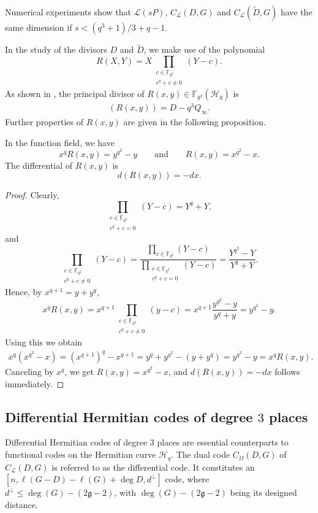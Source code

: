 \documentclass[entropy,article,submit,pdftex,moreauthors]{Definitions/mdpi}
\newcommand{\g}{\mathfrak{g}}
\begin{document}
\begin{Remark}
Numerical experiments show that $\mathscr{L}(sP)$, $C_{\mathcal{L}}(D,G)$ and $C_{\mathcal{L}}(\widetilde{D},G)$ have the same dimension if $s<(q^3+1)/3+q-1$. 
\end{Remark}


In the study of the divisors $D$ and $\widetilde{D}$, we make use of the polynomial 
\[R(X,Y) = X \prod\limits_{\substack{c \in \mathbb{F}_{q^2} \\ c^q + c \neq 0}} (Y-c).\] 
As shown in \cite[Section~2]{korchmaros2013hermitian}, the principal divisor of $R(x,y) \in \mathbb{F}_{q^2}(\mathscr{H}_q)$ is
\begin{align} \label{eq:Rxy-pricdiv}
(R(x,y)) = D-q^3 Q_\infty.
\end{align}
Further properties of $R(x,y)$ are given in the following proposition.
\begin{Proposition} \label{pr:Rxy-props}
In the function field, we have 
\[x^{q}R(x, y) = y^{q^2} - y \qquad \text{and} \qquad R(x, y) = x^{q^2} - x.\]
The differential of $R(x,y)$ is 
\[d(R(x,y))=-dx. \]
\end{Proposition} 
\begin{proof}
Clearly,
\[\prod\limits_{\substack{c \in \mathbb{F}_{q^2} \\ c^q + c = 0}} (Y-c) = Y^q+Y,\]
and
\[\prod\limits_{\substack{c \in \mathbb{F}_{q^2} \\ c^q + c \neq 0}} (Y-c) = \frac{\prod\limits_{c \in \mathbb{F}_{q^2}} (Y-c)}{\prod\limits_{\substack{c \in \mathbb{F}_{q^2} \\ c^q + c = 0}} (Y-c)} = \frac{Y^{q^2}-Y}{Y^q+Y}.\]
Hence, by $x^{q+1}=y+y^q$, 
\[x^qR(x,y) = x^{q+1} \prod\limits_{\substack{c \in \mathbb{F}_{q^2} \\ c^q + c \neq 0}} (y-c) = x^{q+1}\frac{y^{q^2}-y}{y^q+y} = y^{q^2}-y.\]
Using this we obtain
\begin{align*}
x^q(x^{q^2}-x) = (x^{q+1})^q-x^{q+1} = y^q+y^{q^2} - (y+y^q) = y^{q^2}-y = x^qR(x,y).
\end{align*}
Canceling by $x^q$, we get $R(x,y)=x^{q^2}-x$, and $d(R(x,y))=-dx$ follows immediately. 
\end{proof}

\subsection{Differential Hermitian codes of degree $3$ places}

Differential Hermitian codes of degree $3$ places are essential counterparts to functional codes on the Hermitian curve $\mathscr{H}_q$. The dual code $C_{\Omega}(D,G)$ of $C_{\mathcal{L}}(D,G)$ is referred to as the differential code. It constitutes an $[n, \ell(G -D)-\ell(G) +\deg D, d^{\perp}]$ code, where $d^{\perp} \leq \deg(G) - (2\g -2)$, with $\deg(G) - (2\g -2)$ being its designed distance.
\end{document}
